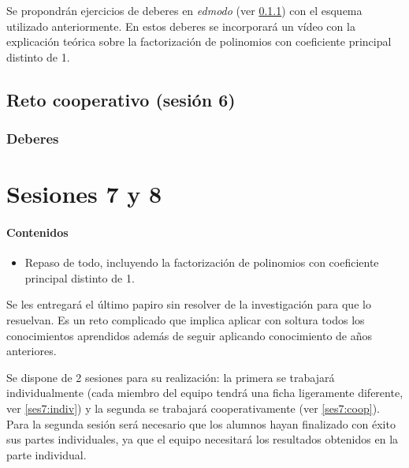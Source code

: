 Se propondrán ejercicios de deberes en \textit{edmodo} (ver \ref{ses6:deberes}) con el esquema utilizado anteriormente.
%
En estos deberes se incorporará un vídeo con la explicación teórica sobre la factorización de polinomios con coeficiente principal distinto de 1.

\subsection{Reto cooperativo (sesión 6)}
\label{ses6:coop}

\subsubsection{Deberes}
\label{ses6:deberes}





\section{Sesiones 7 y 8}


\paragraph{Contenidos}
\begin{itemize}
	\item Repaso de todo, incluyendo la factorización de polinomios con coeficiente principal distinto de 1.
\end{itemize}

Se les entregará el último papiro sin resolver de la investigación para que lo resuelvan.
%
Es un reto complicado que implica aplicar con soltura todos los conocimientos aprendidos además de seguir aplicando conocimiento de años anteriores.


Se dispone de 2 sesiones para su realización: la primera se trabajará individualmente (cada miembro del equipo tendrá una ficha ligeramente diferente, ver \ref{ses7:indiv}) y la segunda se trabajará cooperativamente (ver \ref{ses7:coop}).
%
Para la segunda sesión será necesario que los alumnos hayan finalizado con éxito sus partes individuales, ya que el equipo necesitará los resultados obtenidos en la parte individual.

